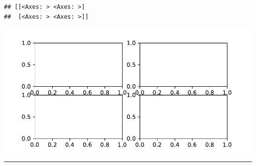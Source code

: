 \documentclass[
]{book}
\theoremstyle{definition}
\theoremstyle{definition}
\theoremstyle{definition}
\theoremstyle{definition}
\theoremstyle{remark}
\begin{document}
\begin{verbatim}
## [[<Axes: > <Axes: >]
##  [<Axes: > <Axes: >]]
\end{verbatim}

\includegraphics{202403181222-MatPlotLib_files/figure-latex/unnamed-chunk-25-29.pdf}

\begin{center}\rule{0.5\linewidth}{0.5pt}\end{center}
\end{document}
